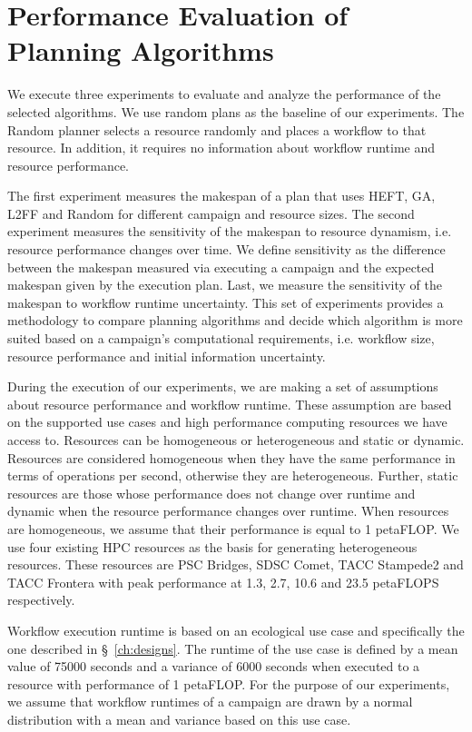 \section{Performance Evaluation of Planning Algorithms}
\label{sec:algo_perf_comp}

We execute three experiments to evaluate and analyze the performance of the selected algorithms.
We use random plans as the baseline of our experiments.
The Random planner selects a resource randomly and places a workflow to that resource.
In addition, it requires no information about workflow runtime and resource performance.

The first experiment measures the makespan of a plan that uses HEFT, GA, L2FF and Random for different campaign and resource sizes.
The second experiment measures the sensitivity of the makespan to resource dynamism, i.e. resource performance changes over time.
We define sensitivity as the difference between the makespan measured via executing a campaign and the expected makespan given by the execution plan.
Last, we measure the sensitivity of the makespan to workflow runtime uncertainty.
This set of experiments provides a methodology to compare planning algorithms and decide which algorithm is more suited based on a campaign's computational requirements, i.e. workflow size, resource performance and initial information uncertainty.

During the execution of our experiments, we are making a set of assumptions about resource performance and workflow runtime.
These assumption are based on the supported use cases and high performance computing resources we have access to.
Resources can be homogeneous or heterogeneous and static or dynamic.
Resources are considered homogeneous when they have the same performance in terms of operations per second, otherwise they are heterogeneous.
Further, static resources are those whose performance does not change over runtime and dynamic when the resource performance changes over runtime.
When resources are homogeneous, we assume that their performance is equal to 1 petaFLOP.
We use four existing HPC resources as the basis for generating heterogeneous resources.
These resources are PSC Bridges, SDSC Comet, TACC Stampede2 and TACC Frontera with peak performance at 1.3, 2.7, 10.6 and 23.5 petaFLOPS respectively.

Workflow execution runtime is based on an ecological use case and specifically the one described in \S~\ref{ch:designs}.
The runtime of the use case is defined by a mean value of 75000 seconds and a variance of 6000 seconds when executed to a resource with performance of 1 petaFLOP.
For the purpose of our experiments, we assume that workflow runtimes of a campaign are drawn by a normal distribution with a mean and variance based on this use case.


